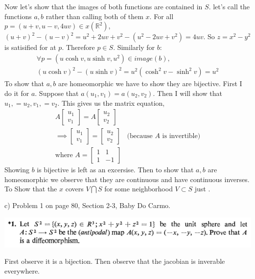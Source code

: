 \documentclass[10pt,letterpaper]{hmcpset}
\begin{document}
\begin{solution}
Now let's show that the images
of both functions are contained in $S$. let's call the functions $a, b$ rather
than calling both of them $x$. For all $p =(u + v, u - v, 4uv) \in
x(\mathbb{R}^2)$, $(u + v)^2 - (u - v)^2 = u^2 + 2uv + v^2 - (u^2 - 2uv + v^2)
= 4uv$. So $z = x^2 - y^2$ is satisified for at $p$. Therefore $p \in S$.
Similarly for $b$:
\begin{align*}
  \forall p = (u \cosh v, u \sinh v, u^2) \in image(b), \\
  (u \cosh v)^2 - (u \sinh v)^2 = u^2(\cosh^2 v - \sinh^2 v) = u^2
\end{align*}
To show that $a, b$ are homeomorphic we have to show they are bijective. First I
do it for $a$. Suppose that $a(u_1, v_1) = a(u_2, v_2)$. Then I will show that
$u_1, = u_2, v_1, = v_2$. This gives us the matrix equation,
\begin{align*}
  A\begin{bmatrix}u_1\\v_1\end{bmatrix} = A \begin{bmatrix}u_2\\v_2\end{bmatrix} \\
  \implies \begin{bmatrix}u_1\\v_1\end{bmatrix} =  \begin{bmatrix}u_2\\v_2\end{bmatrix} &\text{(because $A$ is invertible)}\\
  \text{where } A = \begin{bmatrix}1&1\\1&-1\end{bmatrix}
  \end{align*}
  Showing $b$ is bijective is left as an excersise.
  Then to show that $a, b$ are homeomorphic we observe that they are continuous
  and have continuous inverses. 
 To Show that the $x$ covers $V \bigcap S$ for some neighborhood $V \subset S$ just . 
\end{solution}

\newpage \begin{problem}
c) Problem 1 on page 80, Section 2-3, Baby Do Carmo.

\includegraphics[scale=0.7]{Cc.png}
\end{problem}
\begin{solution}
 First observe it is a bijection. Then observe that the jacobian is inverable everywhere.
\end{solution}
\end{document}
